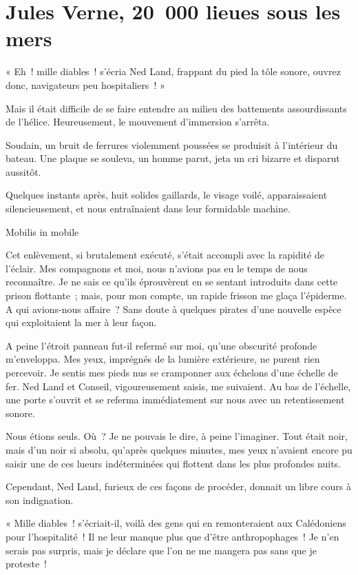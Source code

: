 \documentclass[petitlivre]{livrelitt}
\begin{document}
\chapter{Jules Verne, 20 000 lieues sous les mers}

« Eh ! mille diables ! s’écria Ned Land, frappant du pied la tôle sonore, ouvrez donc, navigateurs peu hospitaliers ! »

Mais il était difficile de se faire entendre au milieu des battements assourdissants de l’hélice. Heureusement, le mouvement d’immersion s’arrêta.

Soudain, un bruit de ferrures violemment poussées se produisit à l’intérieur du bateau. Une plaque se souleva, un homme parut, jeta un cri bizarre et disparut aussitôt.

Quelques instants après, huit solides gaillards, le visage voilé, apparaissaient silencieusement, et nous entraînaient dans leur formidable machine.

\separateurpar

Mobilis in mobile

Cet enlèvement, si brutalement exécuté, s’était accompli avec la rapidité de l’éclair. Mes compagnons et moi, nous n’avions pas eu le temps de nous reconnaître. Je ne sais ce qu’ils éprouvèrent en se sentant introduits dans cette prison flottante ; mais, pour mon compte, un rapide frisson me glaça l’épiderme. A qui avions-nous affaire ? Sans doute à quelques pirates d’une nouvelle espèce qui exploitaient la mer à leur façon.

A peine l’étroit panneau fut-il refermé sur moi, qu’une obscurité profonde m’enveloppa. Mes yeux, imprégnés de la lumière extérieure, ne purent rien percevoir. Je sentis mes pieds nus se cramponner aux échelons d’une échelle de fer. Ned Land et Conseil, vigoureusement saisis, me suivaient. Au bas de l’échelle, une porte s’ouvrit et se referma immédiatement sur nous avec un retentissement sonore.

Nous étions seuls. Où ? Je ne pouvais le dire, à peine l’imaginer. Tout était noir, mais d’un noir si absolu, qu’après quelques minutes, mes yeux n’avaient encore pu saisir une de ces lueurs indéterminées qui flottent dans les plus profondes nuits.

Cependant, Ned Land, furieux de ces façons de procéder, donnait un libre cours à son indignation.

« Mille diables ! s’écriait-il, voilà des gens qui en remonteraient aux Calédoniens pour l’hospitalité ! Il ne leur manque plus que d’être anthropophages ! Je n’en serais pas surpris, mais je déclare que l’on ne me mangera pas sans que je proteste !
\end{document}
